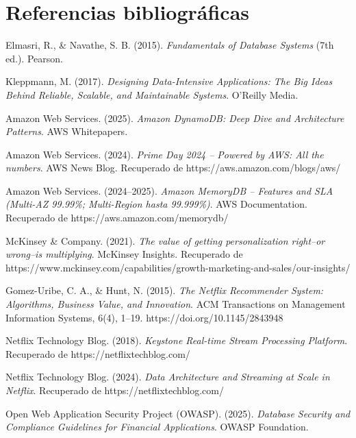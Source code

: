 \documentclass[12pt,a4paper]{article}
\begin{document}
\section{Referencias bibliográficas}
\begin{enumerate}[label={[\arabic*]}]
  \item Elmasri, R., \& Navathe, S. B. (2015). \textit{Fundamentals of Database Systems} (7th ed.). Pearson.
  \item Kleppmann, M. (2017). \textit{Designing Data-Intensive Applications: The Big Ideas Behind Reliable, Scalable, and Maintainable Systems}. O'Reilly Media.
  \item Amazon Web Services. (2025). \textit{Amazon DynamoDB: Deep Dive and Architecture Patterns}. AWS Whitepapers.
  \item \label{aws-primeday2024} Amazon Web Services. (2024). \textit{Prime Day 2024 -- Powered by AWS: All the numbers}. AWS News Blog. Recuperado de https://aws.amazon.com/blogs/aws/
  \item \label{aws-memorydb} Amazon Web Services. (2024--2025). \textit{Amazon MemoryDB -- Features and SLA (Multi-AZ 99.99\%; Multi-Region hasta 99.999\%)}. AWS Documentation. Recuperado de https://aws.amazon.com/memorydb/
  \item \label{mckinsey-personalization} McKinsey \& Company. (2021). \textit{The value of getting personalization right--or wrong--is multiplying}. McKinsey Insights. Recuperado de https://www.mckinsey.com/capabilities/growth-marketing-and-sales/our-insights/
  \item \label{netflix-recsys} Gomez-Uribe, C. A., \& Hunt, N. (2015). \textit{The Netflix Recommender System: Algorithms, Business Value, and Innovation}. ACM Transactions on Management Information Systems, 6(4), 1--19. https://doi.org/10.1145/2843948
  \item \label{netflix-keystone} Netflix Technology Blog. (2018). \textit{Keystone Real-time Stream Processing Platform}. Recuperado de https://netflixtechblog.com/
  \item \label{netflix-kafka-scale} Netflix Technology Blog. (2024). \textit{Data Architecture and Streaming at Scale in Netflix}. Recuperado de https://netflixtechblog.com/
  \item Open Web Application Security Project (OWASP). (2025). \textit{Database Security and Compliance Guidelines for Financial Applications}. OWASP Foundation.
\end{enumerate}
\end{document}
